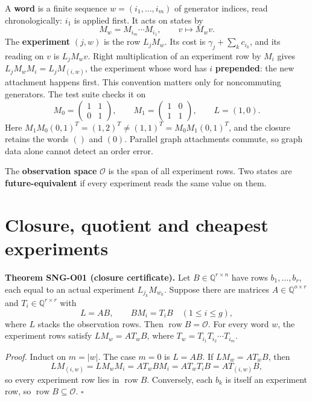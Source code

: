 \documentclass[
  11pt,
  a4paper,
]{report}
\begin{document}
A \textbf{word} is a finite sequence \(w=(i_1,\ldots,i_m)\) of generator
indices, read chronologically: \(i_1\) is applied first. It acts on
states by \[
M_w=M_{i_m}\cdots M_{i_1},\qquad v\mapsto M_wv.
\] The \textbf{experiment} \((j,w)\) is the row \(L_jM_w\). Its cost is
\(\gamma_j+\sum_{k}c_{i_k}\), and its reading on \(v\) is \(L_jM_wv\).
Right multiplication of an experiment row by \(M_i\) gives
\(L_jM_wM_i=L_jM_{(i,w)}\), the experiment whose word has \(i\)
\textbf{prepended}: the new attachment happens first. This convention
matters only for noncommuting generators. The test suite checks it on \[
M_0=\begin{pmatrix}1&1\\0&1\end{pmatrix},\qquad
M_1=\begin{pmatrix}1&0\\1&1\end{pmatrix},\qquad L=(1,0).
\] Here \(M_1M_0(0,1)^T=(1,2)^T\ne(1,1)^T=M_0M_1(0,1)^T\), and the
closure retains the words \(()\) and \((0)\). Parallel graph attachments
commute, so graph data alone cannot detect an order error.

The \textbf{observation space} \(\mathcal O\) is the span of all
experiment rows. Two states are \textbf{future-equivalent} if every
experiment reads the same value on them.

\hypertarget{closure-quotient-and-cheapest-experiments}{%
\section{Closure, quotient and cheapest
experiments}\label{closure-quotient-and-cheapest-experiments}}

\textbf{Theorem SNG-O01 (closure certificate).} Let
\(B\in\mathbb Q^{r\times n}\) have rows \(b_1,\ldots,b_r\), each equal
to an actual experiment \(L_{j_k}M_{w_k}\). Suppose there are matrices
\(A\in\mathbb Q^{o\times r}\) and \(T_i\in\mathbb Q^{r\times r}\) with
\[
L=AB,\qquad BM_i=T_iB\quad(1\le i\le g),
\] where \(L\) stacks the observation rows. Then
\(\operatorname{row}B=\mathcal O\). For every word \(w\), the experiment
rows satisfy \(LM_w=AT_wB\), where \(T_w=T_{i_1}T_{i_2}\cdots T_{i_m}\).

\emph{Proof.} Induct on \(m=|w|\). The case \(m=0\) is \(L=AB\). If
\(LM_w=AT_wB\), then \[
LM_{(i,w)}=LM_wM_i=AT_wBM_i=AT_wT_iB=AT_{(i,w)}B,
\] so every experiment row lies in \(\operatorname{row}B\). Conversely,
each \(b_k\) is itself an experiment row, so
\(\operatorname{row}B\subseteq\mathcal O\). \(\square\)
\end{document}
